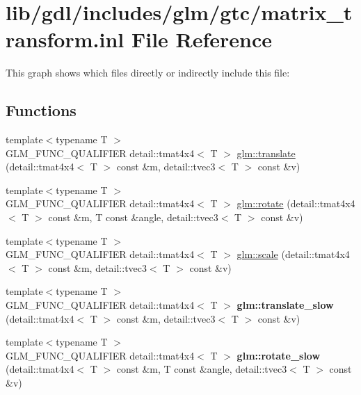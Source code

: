 \hypertarget{matrix__transform_8inl}{}\section{lib/gdl/includes/glm/gtc/matrix\+\_\+transform.inl File Reference}
\label{matrix__transform_8inl}
This graph shows which files directly or indirectly include this file\+:
\subsection*{Functions}
\begin{DoxyCompactItemize}
\item 
{\footnotesize template$<$typename T $>$ }\\G\+L\+M\+\_\+\+F\+U\+N\+C\+\_\+\+Q\+U\+A\+L\+I\+F\+I\+E\+R detail\+::tmat4x4$<$ T $>$ \hyperlink{group__gtc__matrix__transform_ga8925161ecc1767957900c5ca8b922dc4}{glm\+::translate} (detail\+::tmat4x4$<$ T $>$ const \&m, detail\+::tvec3$<$ T $>$ const \&v)
\item 
{\footnotesize template$<$typename T $>$ }\\G\+L\+M\+\_\+\+F\+U\+N\+C\+\_\+\+Q\+U\+A\+L\+I\+F\+I\+E\+R detail\+::tmat4x4$<$ T $>$ \hyperlink{group__gtc__matrix__transform_gaacb9cbe8f93a8fef9dc3e25559df19c0}{glm\+::rotate} (detail\+::tmat4x4$<$ T $>$ const \&m, T const \&angle, detail\+::tvec3$<$ T $>$ const \&v)
\item 
{\footnotesize template$<$typename T $>$ }\\G\+L\+M\+\_\+\+F\+U\+N\+C\+\_\+\+Q\+U\+A\+L\+I\+F\+I\+E\+R detail\+::tmat4x4$<$ T $>$ \hyperlink{group__gtc__matrix__transform_ga223e08009f1cab54651200b81e91981c}{glm\+::scale} (detail\+::tmat4x4$<$ T $>$ const \&m, detail\+::tvec3$<$ T $>$ const \&v)
\item 
\hypertarget{namespaceglm_aa2b6b80e7eef76aee5212899971fb11b}{}{\footnotesize template$<$typename T $>$ }\\G\+L\+M\+\_\+\+F\+U\+N\+C\+\_\+\+Q\+U\+A\+L\+I\+F\+I\+E\+R detail\+::tmat4x4$<$ T $>$ {\bfseries glm\+::translate\+\_\+slow} (detail\+::tmat4x4$<$ T $>$ const \&m, detail\+::tvec3$<$ T $>$ const \&v)\label{namespaceglm_aa2b6b80e7eef76aee5212899971fb11b}

\item 
\hypertarget{namespaceglm_ac9cf508a8aafbe789407ceedc8bba577}{}{\footnotesize template$<$typename T $>$ }\\G\+L\+M\+\_\+\+F\+U\+N\+C\+\_\+\+Q\+U\+A\+L\+I\+F\+I\+E\+R detail\+::tmat4x4$<$ T $>$ {\bfseries glm\+::rotate\+\_\+slow} (detail\+::tmat4x4$<$ T $>$ const \&m, T const \&angle, detail\+::tvec3$<$ T $>$ const \&v)\label{namespaceglm_ac9cf508a8aafbe789407ceedc8bba577}


\end{DoxyCompactItemize}

